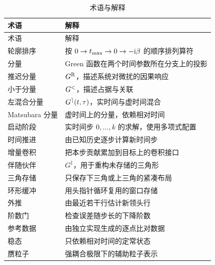 \begin{longtable}{@{}p{}p{}@{}}
    \caption[术语与解释]{术语与解释}\label{tab:glossary}\\
    \toprule
    术语 & 解释 \\
    \midrule
    \endfirsthead
    \toprule
    术语 & 解释 \\
    \midrule
    \endhead
    \bottomrule
    \endfoot
    轮廓排序 & 按 $0\to t_{\max}\to0\to-\mathrm{i}\beta$ 的顺序排列算符 \\
    分量 & Green 函数在两个时间参数所在分支上的投影 \\
    推迟分量 & $G^{\mathrm{R}}$，描述系统对微扰的因果响应 \\
    小于分量 & $G^{<}$，描述占据与关联 \\
    左混合分量 & $G^{\rceil}(t,\tau)$，实时间与虚时间混合 \\
    Matsubara 分量 & 虚时间上的分量，依赖相对时间 \\
    启动阶段 & 实时间步 $0,\ldots,k$ 的求解，使用多项式配置 \\
    时间推进 & 由已知历史逐步计算新时间步 \\
    增量卷积 & 把本步贡献累加到目标上的卷积接口 \\
    伴随伙伴 & $G^{\ddagger}$，用于重构未存储的三角形 \\
    三角存储 & 只保存下三角或上三角的紧凑布局 \\
    环形缓冲 & 用头指针循环复用的窗口存储 \\
    外推 & 由最近若干行估计新领头行 \\
    阶数门 & 检查误差随步长的下降阶数 \\
    参考数据 & 由独立实现生成的逐点比对数据 \\
    稳态 & 只依赖相对时间的定常状态 \\
    赝粒子 & 强耦合极限下的辅助粒子表示 \\
    \bottomrule
\end{longtable}
